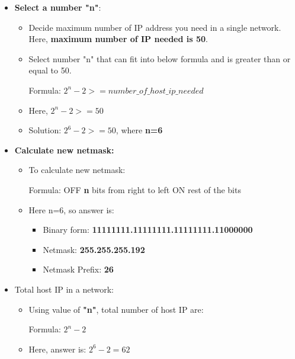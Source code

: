 \begin{flushleft}
\begin{itemize}
		\item \textbf{Select a number "n"}:
		\begin{itemize}
			\item Decide maximum number of IP address you need in a single network. Here, \textbf{maximum number of IP needed is 50}.
			\item Select number "n" that can fit into below formula and is greater than or equal to 50.
			\bigskip
			\begin{tcolorbox}[breakable,notitle,boxrule=-0pt,colback=pink,colframe=pink]
				\color{black}
				Formula: $2^n-2 >= number\_of\_host\_ip\_needed$
				\font=4pt
			\end{tcolorbox}
			\item Here, $2^n-2 >= 50$
			\item Solution: $2^6-2 >= 50$, where \textbf{n=6}
		\end{itemize}
		\item \textbf{Calculate new netmask:}
		\begin{itemize}
			\item To calculate new netmask:
			\bigskip
			\begin{tcolorbox}[breakable,notitle,boxrule=-0pt,colback=pink,colframe=pink]
				\color{black}
				Formula: 
				\newline
				OFF \textbf{n} bits from right to left
				\newline
				ON rest of the bits
				\font=4pt
			\end{tcolorbox}
			\item Here n=6, so answer is:
			\begin{itemize}
				\item Binary form: \textbf{11111111.11111111.11111111.11000000}
				\item Netmask: \textbf{255.255.255.192}
				\item Netmask Prefix: \textbf{26}
			\end{itemize}
		\end{itemize}
		\item Total host IP in a network:
		\begin{itemize}
			\item Using value of \textbf{"n"}, total number of host IP are:
			\begin{tcolorbox}[breakable,notitle,boxrule=-0pt,colback=pink,colframe=pink]
				\color{black}
				Formula: $2^n-2$
				\font=4pt
			\end{tcolorbox}
			\item Here, answer is: $2^6-2=62$

\end{itemize}
\end{itemize}
\end{flushleft}

